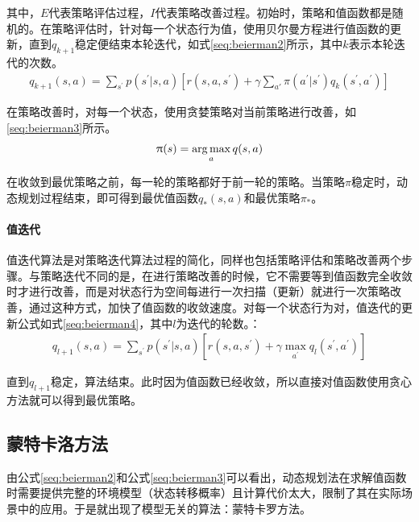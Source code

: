 其中，$E$代表策略评估过程，$I$代表策略改善过程。初始时，策略和值函数都是随机的。在策略评估时，针对每一个状态行为值，使用贝尔曼方程进行值函数的更新，直到$q_{k+1}$稳定便结束本轮迭代，如式\eqref{seq:beierman2}所示，其中$k$表示本轮迭代的次数。
\begin{equation}\label{seq:beierman2}
\begin{aligned}
q_{k+1}(s,a)=\sum_{s^{'}}p(s^{'}|s,a)[r(s,a,s^{'})+ \gamma \sum_{a'}\pi(a^{'}|s^{'}) q_{k}(s^{'},a^{'})]
\end{aligned}
\end{equation}

在策略改善时，对每一个状态，使用贪婪策略对当前策略进行改善，如\eqref{seq:beierman3}所示。
\begin{equation}\label{seq:beierman3}
\begin{aligned}
\uppi(s)=\operatorname*{arg\,max}_{a}q(s,a)
\end{aligned}
\end{equation}

在收敛到最优策略之前，每一轮的策略都好于前一轮的策略。当策略$\pi$稳定时，动态规划过程结束，即可得到最优值函数$q_{*}(s,a)$和最优策略$\pi_{*}$。
\paragraph{值迭代}

值迭代算法是对策略迭代算法过程的简化，同样也包括策略评估和策略改善两个步骤。与策略迭代不同的是，在进行策略改善的时候，它不需要等到值函数完全收敛时才进行改善，而是对状态行为空间每进行一次扫描（更新）就进行一次策略改善，通过这种方式，加快了值函数的收敛速度。对每一个状态行为对，值迭代的更新公式如式\eqref{seq:beierman4}，其中$l$为迭代的轮数。：
\begin{equation}
\begin{aligned}\label{seq:beierman4}
q_{l+1}(s,a)=\sum_{s^{'}}p(s^{'}|s,a)[r(s,a,s^{'})+ \gamma \max_{a^{'}} q_{l}(s^{'},a^{'})]
\end{aligned}
\end{equation}

直到$q_{l+1}$稳定，算法结束。此时因为值函数已经收敛，所以直接对值函数使用贪心方法就可以得到最优策略。

\subsection{蒙特卡洛方法}
由公式\eqref{seq:beierman2}和公式\eqref{seq:beierman3}可以看出，动态规划法在求解值函数时需要提供完整的环境模型（状态转移概率）且计算代价太大，限制了其在实际场景中的应用。于是就出现了模型无关的算法：蒙特卡罗方法。


